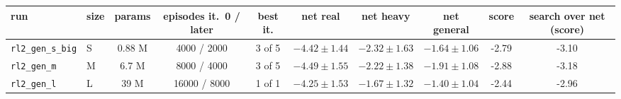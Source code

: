 \begin{tabular}{@{}llcccccccc@{}}
\toprule
run & size & params & episodes it.\ 0 / later & best it. & net real & net heavy & net general & score & search over net (score) \\
\midrule
\texttt{rl2\_gen\_s\_big} & S & 0.88 M & 4000 / 2000 & 3 of 5 & $-4.42 \pm 1.44$ & $-2.32 \pm 1.63$ & $-1.64 \pm 1.06$ & -2.79 & -3.10 \\
\texttt{rl2\_gen\_m} & M & 6.7 M & 8000 / 4000 & 3 of 5 & $-4.49 \pm 1.55$ & $-2.22 \pm 1.38$ & $-1.91 \pm 1.08$ & -2.88 & -3.18 \\
\texttt{rl2\_gen\_l} & L & 39 M & 16000 / 8000 & 1 of 1 & $-4.25 \pm 1.53$ & $-1.67 \pm 1.32$ & $-1.40 \pm 1.04$ & -2.44 & -2.96 \\
\bottomrule
\end{tabular}
